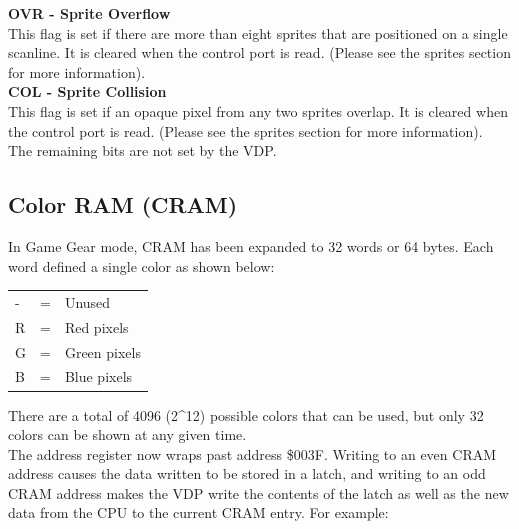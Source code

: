 \documentclass{article}
\begin{document}
\textbf{OVR - Sprite Overflow}
\\

This flag is set if there are more than eight sprites that are positioned on a
single scanline. It is cleared when the control port is read.  (Please see the
sprites section for more information).
\\

\textbf{COL - Sprite Collision}
\\

This flag is set if an opaque pixel from any two sprites overlap. It is cleared
when the control port is read. (Please see the sprites section for more
information).
\\

The remaining bits are not set by the VDP.

\subsection{Color RAM (CRAM)}

In Game Gear mode, CRAM has been expanded to 32 words or 64 bytes. Each word
defined a single color as shown below:

\begin{table}[H]
    \centering
    \begin{tabular}{l c l}
        - & = & Unused          \\
        R & = & Red pixels      \\
        G & = & Green pixels    \\
        B & = & Blue pixels     \\
    \end{tabular}
\end{table}

There are a total of 4096 (2\^{}12) possible colors that can be used, but only
32 colors can be shown at any given time.
\\

The address register now wraps past address \$003F. Writing to an even CRAM
address causes the data written to be stored in a latch, and writing to an odd
CRAM address makes the VDP write the contents of the latch as well as the new
data from the CPU to the current CRAM entry. For example:
\end{document}
